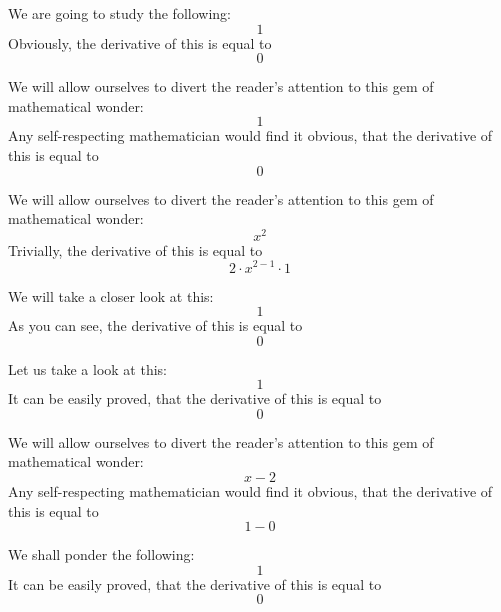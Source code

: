 \documentclass{article}
\begin{document}
We are going to study the following:
\begin{equation}
1 
\end{equation}
Obviously, the derivative of this is equal to
\begin{equation}
0 
\end{equation}

We will allow ourselves to divert the reader's attention to this gem of mathematical wonder:
\begin{equation}
1 
\end{equation}
Any self-respecting mathematician would find it obvious, that the derivative of this is equal to
\begin{equation}
0 
\end{equation}

We will allow ourselves to divert the reader's attention to this gem of mathematical wonder:
\begin{equation}
x ^{2 } 
\end{equation}
Trivially, the derivative of this is equal to
\begin{equation}
2 \cdot x ^{2 - 1 } \cdot 1 
\end{equation}

We will take a closer look at this:
\begin{equation}
1 
\end{equation}
As you can see, the derivative of this is equal to
\begin{equation}
0 
\end{equation}

Let us take a look at this:
\begin{equation}
1 
\end{equation}
It can be easily proved, that the derivative of this is equal to
\begin{equation}
0 
\end{equation}

We will allow ourselves to divert the reader's attention to this gem of mathematical wonder:
\begin{equation}
x - 2 
\end{equation}
Any self-respecting mathematician would find it obvious, that the derivative of this is equal to
\begin{equation}
1 - 0 
\end{equation}

We shall ponder the following:
\begin{equation}
1 
\end{equation}
It can be easily proved, that the derivative of this is equal to
\begin{equation}
0 
\end{equation}
\end{document}
